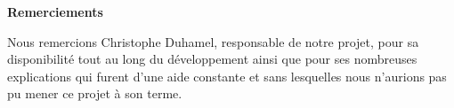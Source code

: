 \null
\vspace{4cm}
\begin{flushright}
	{\Large \bfseries Remerciements}

	\vspace{1cm}

	\begin{minipage}{0.62\textwidth}
		Nous remercions Christophe Duhamel, responsable de notre projet, pour sa disponibilité tout au long du développement ainsi que pour ses nombreuses explications qui furent d'une aide constante et sans lesquelles nous n'aurions pas pu mener ce projet à son terme.
	\end{minipage}

\end{flushright}
